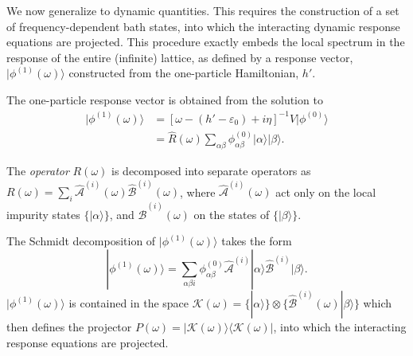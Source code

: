 \documentclass[aps,twocolumn,nobibnotes]{revtex4}
\begin{document}
We now generalize to dynamic quantities. This requires the construction of a set of frequency-dependent bath states, into which the
interacting dynamic response equations are projected. This procedure exactly embeds the local spectrum in the response of the entire (infinite) lattice, 
as defined by a response vector, $|\phi^{(1)}(\omega) \rangle$ constructed from the one-particle Hamiltonian, $h'$.
\begin{inparaenum}
\item The one-particle response vector is obtained from the solution to
\begin{align}
|\phi^{(1)}(\omega) \rangle &= \left[ \omega-(h'-\varepsilon_0)+i\eta \right]^{-1} {\hat V} |\phi^{(0)}\rangle  \nonumber \\ 
                            &= {\hat R}(\omega) \sum_{\alpha \beta} \phi^{(0)}_{\alpha \beta} |\alpha \rangle |\beta \rangle    .
\end{align}
\item The {\em operator} $R(\omega)$ is decomposed into separate operators as $R(\omega) = \sum_i {\hat {\mathcal{A}}}^{(i)}(\omega) {\hat {\mathcal{B}}}^{(i)}(\omega)$, 
where ${\hat {\mathcal{A}}}^{(i)}(\omega)$ act only on the local impurity states $\{ |\alpha \rangle \}$, and ${\hat {\mathcal{B}}}^{(i)}(\omega)$ on the states of $\{ |\beta\rangle \}$.
\item The Schmidt decomposition of $| \phi^{(1)}(\omega) \rangle$ takes the form
\begin{equation}
|\phi^{(1)}(\omega) \rangle = \sum_{\alpha \beta i} \phi^{(0)}_{\alpha \beta} {\hat {\mathcal{A}}}^{(i)} |\alpha \rangle {\hat {\mathcal{B}}}^{(i)} |\beta \rangle .
\end{equation}
$| \phi^{(1)}(\omega) \rangle$ is contained in the space $\mathcal{K}(\omega) = \{ |\alpha \rangle \} \otimes \{\hat {\mathcal{B}}^{(i)}(\omega) | \beta \rangle \}$ which 
then defines the projector $P(\omega) = |\mathcal{K}(\omega)\rangle \langle \mathcal{K}(\omega) |$, into which the interacting response equations are projected.

\end{inparaenum}
\end{document}
